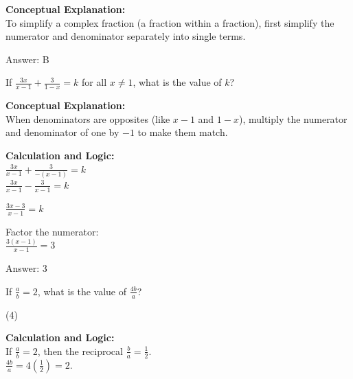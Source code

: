 \documentclass[11pt,paper=a4,answers]{exam}
\begin{document}
\begin{questions}
\begin{solution}
\textbf{Conceptual Explanation:} \\
To simplify a complex fraction (a fraction within a fraction), first simplify the numerator and denominator separately into single terms.

\vspace{25pt}

Answer: \colorbox{yellow!100}{B}
\end{solution}

\vspace{40pt}

\question
If $\frac{3x}{x-1} + \frac{3}{1-x} = k$ for all $x \neq 1$, what is the value of $k$?

\begin{solution}
\textbf{Conceptual Explanation:} \\
When denominators are opposites (like $x-1$ and $1-x$), multiply the numerator and denominator of one by $-1$ to make them match.

\vspace{20pt}

\textbf{Calculation and Logic:} \\
$\frac{3x}{x-1} + \frac{3}{-(x-1)} = k$ \\
$\frac{3x}{x-1} - \frac{3}{x-1} = k$

\vspace{10pt}

$\frac{3x - 3}{x - 1} = k$

\vspace{10pt}

Factor the numerator: \\
$\frac{3(x-1)}{x-1} = 3$

\vspace{25pt}

Answer: \colorbox{yellow!100}{3}
\end{solution}

\vspace{40pt}

\question
If $\frac{a}{b} = 2$, what is the value of $\frac{4b}{a}$?
\begin{tasks}(4)
\end{tasks}

\begin{solution}
\textbf{Calculation and Logic:} \\
If $\frac{a}{b} = 2$, then the reciprocal $\frac{b}{a} = \frac{1}{2}$. \\
$\frac{4b}{a} = 4 \left( \frac{1}{2} \right) = 2$.


\end{solution}
\end{questions}
\end{document}
